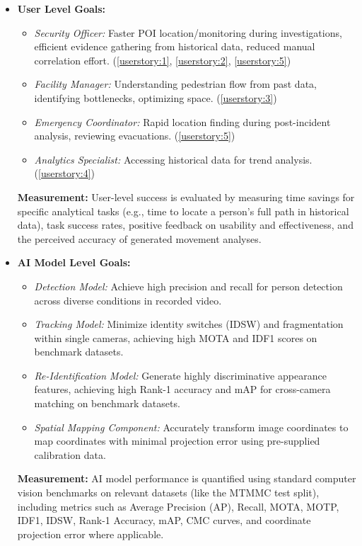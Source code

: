 \begin{itemize}
    \item \textbf{User Level Goals:}
        \begin{itemize}
            \item \textit{Security Officer:} Faster POI location/monitoring during investigations, efficient evidence gathering from historical data, reduced manual correlation effort. (\ref{userstory:1}, \ref{userstory:2}, \ref{userstory:5})
            \item \textit{Facility Manager:} Understanding pedestrian flow from past data, identifying bottlenecks, optimizing space. (\ref{userstory:3})
            \item \textit{Emergency Coordinator:} Rapid location finding during post-incident analysis, reviewing evacuations. (\ref{userstory:5})
            \item \textit{Analytics Specialist:} Accessing historical data for trend analysis. (\ref{userstory:4})
        \end{itemize}
        \textbf{Measurement:} User-level success is evaluated by measuring time savings for specific analytical tasks (e.g., time to locate a person's full path in historical data), task success rates, positive feedback on usability and effectiveness, and the perceived accuracy of generated movement analyses.

    \item \textbf{AI Model Level Goals:}
        \begin{itemize}
            \item \textit{Detection Model:} Achieve high precision and recall for person detection across diverse conditions in recorded video.
            \item \textit{Tracking Model:} Minimize identity switches (IDSW) and fragmentation within single cameras, achieving high MOTA and IDF1 scores on benchmark datasets.
            \item \textit{Re-Identification Model:} Generate highly discriminative appearance features, achieving high Rank-1 accuracy and mAP for cross-camera matching on benchmark datasets.
            \item \textit{Spatial Mapping Component:} Accurately transform image coordinates to map coordinates with minimal projection error using pre-supplied calibration data.
        \end{itemize}
        \textbf{Measurement:} AI model performance is quantified using standard computer vision benchmarks on relevant datasets (like the MTMMC test split), including metrics such as Average Precision (AP), Recall, MOTA, MOTP, IDF1, IDSW, Rank-1 Accuracy, mAP, CMC curves, and coordinate projection error where applicable.
\end{itemize}
